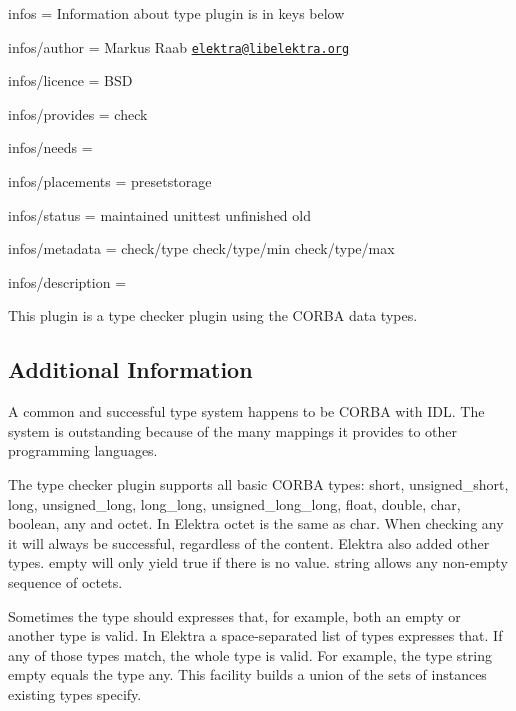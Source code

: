 
\begin{DoxyItemize}
\item infos = Information about type plugin is in keys below
\item infos/author = Markus Raab \href{mailto:elektra@libelektra.org}{\tt elektra@libelektra.\+org}
\item infos/licence = B\+S\+D
\item infos/provides = check
\item infos/needs =
\item infos/placements = presetstorage
\item infos/status = maintained unittest unfinished old
\item infos/metadata = check/type check/type/min check/type/max
\item infos/description =
\end{DoxyItemize}

This plugin is a type checker plugin using the {\ttfamily C\+O\+R\+B\+A} data types.

\subsection*{Additional Information}

A common and successful type system happens to be C\+O\+R\+B\+A with I\+D\+L. The system is outstanding because of the many mappings it provides to other programming languages.

The type checker plugin supports all basic C\+O\+R\+B\+A types\+: {\ttfamily short}, {\ttfamily unsigned\+\_\+short}, {\ttfamily long}, {\ttfamily unsigned\+\_\+long}, {\ttfamily long\+\_\+long}, {\ttfamily unsigned\+\_\+long\+\_\+long}, {\ttfamily float}, {\ttfamily double}, {\ttfamily char}, {\ttfamily boolean}, {\ttfamily any} and {\ttfamily octet}. In Elektra {\ttfamily octet} is the same as {\ttfamily char}. When checking any it will always be successful, regardless of the content. Elektra also added other types. {\ttfamily empty} will only yield true if there is no value. {\ttfamily string} allows any non-\/empty sequence of octets.

Sometimes the type should expresses that, for example, both an empty or another type is valid. In Elektra a space-\/separated list of types expresses that. If any of those types match, the whole type is valid. For example, the type {\ttfamily string empty} equals the type {\ttfamily any}. This facility builds a union of the sets of instances existing types specify.

